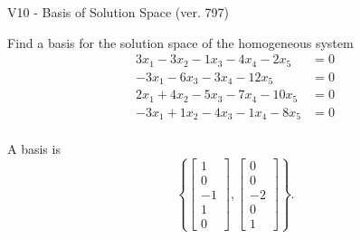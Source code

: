 \begin{exercise}
  \begin{exerciseTitle}V10 - Basis of Solution Space (ver. 797)\end{exerciseTitle}
  \begin{exerciseStatement}
    Find a basis for the solution space of the homogeneous system 
\begin{align*}
 3 x_ 1 -3 x_ 2 -1 x_ 3 -4 x_ 4 -2 x_ 5 &= 0  \\ 
  -3 x_ 1 -6 x_ 3 -3 x_ 4 -12 x_ 5 &= 0  \\ 
  2 x_ 1 + 4 x_ 2 -5 x_ 3 -7 x_ 4 -10 x_ 5 &= 0  \\ 
  -3 x_ 1 + 1 x_ 2 -4 x_ 3 -1 x_ 4 -8 x_ 5 &= 0  \\ 
 \end{align*}


 
  \end{exerciseStatement}

  \begin{exerciseAnswer}
   A basis is   
\[\left\{\left[\begin{array}{c}
1 \\
0 \\
-1 \\
1 \\
0
\end{array}\right] , \left[\begin{array}{c}
0 \\
0 \\
-2 \\
0 \\
1
\end{array}\right]\right\}.\]

  


  \end{exerciseAnswer}
\end{exercise}